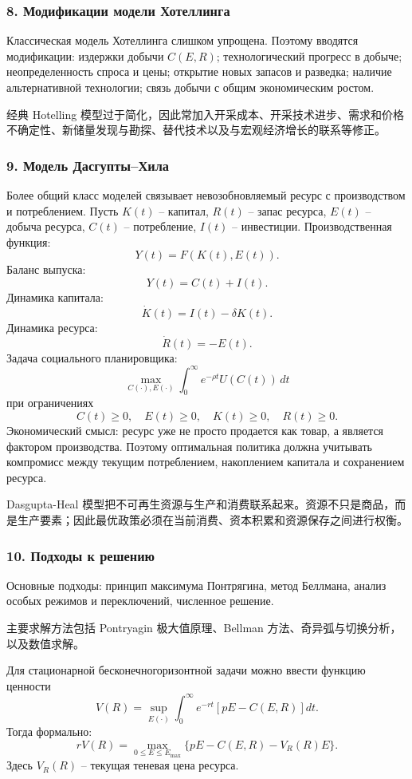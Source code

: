 \documentclass[12pt,a4paper]{article}
\newcommand{\zh}[1]{\par\noindent #1\par}
\begin{document}
\subsubsection*{8. Модификации модели Хотеллинга}
Классическая модель Хотеллинга слишком упрощена. Поэтому вводятся модификации: издержки добычи $C(E,R)$; технологический прогресс в добыче; неопределенность спроса и цены; открытие новых запасов и разведка; наличие альтернативной технологии; связь добычи с общим экономическим ростом.

\zh{经典 Hotelling 模型过于简化，因此常加入开采成本、开采技术进步、需求和价格不确定性、新储量发现与勘探、替代技术以及与宏观经济增长的联系等修正。}

\subsubsection*{9. Модель Дасгупты--Хила}
Более общий класс моделей связывает невозобновляемый ресурс с производством и потреблением. Пусть $K(t)$ -- капитал, $R(t)$ -- запас ресурса, $E(t)$ -- добыча ресурса, $C(t)$ -- потребление, $I(t)$ -- инвестиции. Производственная функция:
\[
Y(t)=F(K(t),E(t)).
\]
Баланс выпуска:
\[
Y(t)=C(t)+I(t).
\]
Динамика капитала:
\[
\dot K(t)=I(t)-\delta K(t).
\]
Динамика ресурса:
\[
\dot R(t)=-E(t).
\]
Задача социального планировщика:
\[
\max_{C(\cdot),E(\cdot)}\int_0^\infty e^{-\rho t}U(C(t))\,dt
\]
при ограничениях
\[
C(t)\ge 0,
\quad
E(t)\ge 0,
\quad
K(t)\ge 0,
\quad
R(t)\ge 0.
\]
Экономический смысл: ресурс уже не просто продается как товар, а является фактором производства. Поэтому оптимальная политика должна учитывать компромисс между текущим потреблением, накоплением капитала и сохранением ресурса.

\zh{Dasgupta-Heal 模型把不可再生资源与生产和消费联系起来。资源不只是商品，而是生产要素；因此最优政策必须在当前消费、资本积累和资源保存之间进行权衡。}

\subsubsection*{10. Подходы к решению}
Основные подходы: принцип максимума Понтрягина, метод Беллмана, анализ особых режимов и переключений, численное решение.

\zh{主要求解方法包括 Pontryagin 极大值原理、Bellman 方法、奇异弧与切换分析，以及数值求解。}

Для стационарной бесконечногоризонтной задачи можно ввести функцию ценности
\[
V(R)=\sup_{E(\cdot)}\int_0^\infty e^{-rt}\left[pE-C(E,R)\right]dt.
\]
Тогда формально:
\[
rV(R)=\max_{0\le E\le E_{\max}}\{pE-C(E,R)-V_R(R)E\}.
\]
Здесь $V_R(R)$ -- текущая теневая цена ресурса.
\end{document}
